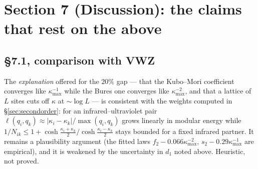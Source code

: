 \documentclass[11pt]{article}
\begin{document}
\section{Section 7 (Discussion): the claims that rest on the above}\label{sec:discussion}

\subsection{\S7.1, comparison with VWZ}

The \emph{explanation} offered for the $20\%$ gap --- that the Kubo--Mori coefficient converges
like $\kappa_{\max}^{-1}$ while the Bures one converges like $\kappa_{\max}^{-2}$, and that a
lattice of $L$ sites cuts off $\kappa$ at $\sim\log L$ --- is consistent with the weights computed
in \S\ref{sec:secondorder}: for an infrared--ultraviolet pair
$\ell(q_i,q_k)\approx|\kappa_i-\kappa_k|/\max(q_i,q_k)$ grows linearly in modular energy while
$1/N_{ik}\le1+\cosh\frac{\kappa_i+\kappa_k}2/\cosh\frac{\kappa_i-\kappa_k}2$ stays bounded for a
fixed infrared partner.  It remains a plausibility argument (the fitted laws
$f_2-0.066\kappa_{\max}^{-2}$, $s_2-0.29\kappa_{\max}^{-1}$ are empirical), and it is weakened by
the uncertainty in $d_1$ noted above.  Heuristic, not proved.
\end{document}
